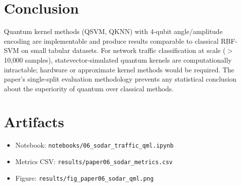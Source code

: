 \documentclass[12pt,a4paper]{article}
\begin{document}
\section{Conclusion}
Quantum kernel methods (QSVM, QKNN) with 4-qubit angle/amplitude encoding are implementable and produce results comparable to classical RBF-SVM on small tabular datasets. For network traffic classification at scale ($>$10,000 samples), statevector-simulated quantum kernels are computationally intractable; hardware or approximate kernel methods would be required. The paper's single-split evaluation methodology prevents any statistical conclusion about the superiority of quantum over classical methods.

\appendix
\section{Artifacts}
\begin{itemize}
  \item Notebook: \texttt{notebooks/06\_sodar\_traffic\_qml.ipynb}
  \item Metrics CSV: \texttt{results/paper06\_sodar\_metrics.csv}
  \item Figure: \texttt{results/fig\_paper06\_sodar\_qml.png}
\end{itemize}
\end{document}
